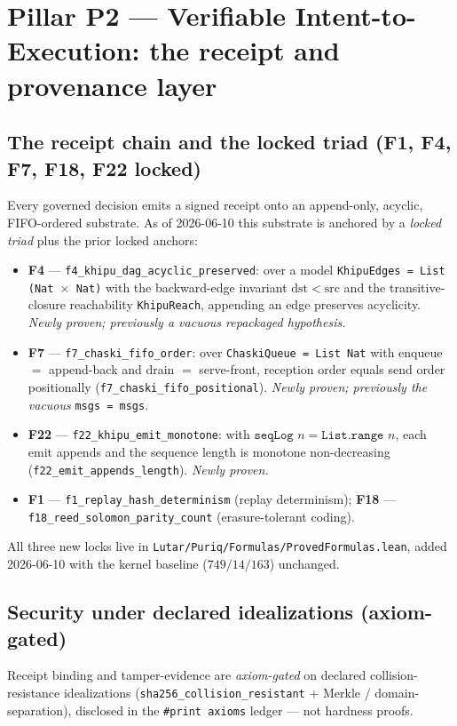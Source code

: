 \documentclass[11pt,letterpaper]{article}
\theoremstyle{definition}
\begin{document}
\section{Pillar P2 --- Verifiable Intent-to-Execution: the receipt and provenance layer}\label{sec:p2}

\subsection{The receipt chain and the locked triad (F1, F4, F7, F18, F22 locked)}
Every governed decision emits a signed receipt onto an append-only, acyclic,
FIFO-ordered substrate. As of 2026-06-10 this substrate is anchored by a
\emph{locked triad} plus the prior locked anchors:
\begin{itemize}
\item \textbf{F4} --- \texttt{f4\_khipu\_dag\_acyclic\_preserved}: over a model
\texttt{KhipuEdges = List (Nat $\times$ Nat)} with the backward-edge invariant
$\mathrm{dst}<\mathrm{src}$ and the transitive-closure reachability
\texttt{KhipuReach}, appending an edge preserves acyclicity. \emph{Newly proven;
previously a vacuous repackaged hypothesis.}
\item \textbf{F7} --- \texttt{f7\_chaski\_fifo\_order}: over
\texttt{ChaskiQueue = List Nat} with enqueue $=$ append-back and drain $=$
serve-front, reception order equals send order positionally
(\texttt{f7\_chaski\_fifo\_positional}). \emph{Newly proven; previously the
vacuous} \texttt{msgs = msgs}.
\item \textbf{F22} --- \texttt{f22\_khipu\_emit\_monotone}: with
$\texttt{seqLog } n = \texttt{List.range } n$, each emit appends and the sequence
length is monotone non-decreasing (\texttt{f22\_emit\_appends\_length}).
\emph{Newly proven.}
\item \textbf{F1} --- \texttt{f1\_replay\_hash\_determinism} (replay
determinism); \textbf{F18} --- \texttt{f18\_reed\_solomon\_parity\_count}
(erasure-tolerant coding).
\end{itemize}
All three new locks live in \texttt{Lutar/Puriq/Formulas/ProvedFormulas.lean},
added 2026-06-10 with the kernel baseline ($749/14/163$) unchanged.

\subsection{Security under declared idealizations (axiom-gated)}
Receipt binding and tamper-evidence are \emph{axiom-gated} on declared
collision-resistance idealizations (\texttt{sha256\_collision\_resistant} +
Merkle / domain-separation), disclosed in the \texttt{\#print axioms} ledger ---
not hardness proofs.
\end{document}
